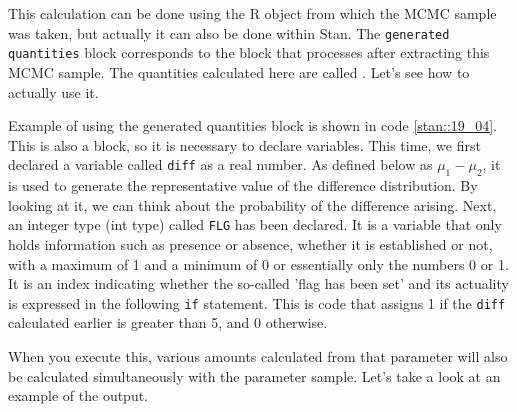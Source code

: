 \documentclass{ltjsbook}
\begin{document}
{%
This calculation can be done using the R object from which the MCMC sample was taken, but actually it can also be done within Stan.
The \texttt{generated quantities} block corresponds to the block that processes after extracting this MCMC sample. The quantities calculated here are called .
Let's see how to actually use it.



Example of using the generated quantities block is shown in code \ref{stan::19_04}. This is also a block, so it is necessary to declare variables.
This time, we first declared a variable called \verb|diff| as a real number. As defined below as $\mu_1-\mu_2$, it is used to generate the representative value of the difference distribution. By looking at it, we can think about the probability of the difference arising.
Next, an integer type (int type) called \verb|FLG| has been declared. It is a variable that only holds information such as presence or absence, whether it is established or not, with a maximum of 1 and a minimum of 0 or essentially only the numbers 0 or 1. It is an index indicating whether the so-called 'flag has been set' and its actuality is expressed in the following \texttt{if} statement. This is code that assigns 1 if the \verb|diff| calculated earlier is greater than 5, and 0 otherwise.

When you execute this, various amounts calculated from that parameter will also be calculated simultaneously with the parameter sample. Let's take a look at an example of the output.


}
\end{document}
